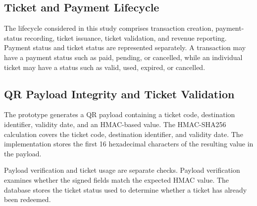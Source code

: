 \documentclass[runningheads]{llncs}
\begin{document}

\subsection{Ticket and Payment Lifecycle}

The lifecycle considered in this study comprises transaction
creation, payment-status recording, ticket issuance, ticket validation,
and revenue reporting. Payment status and ticket status are represented
separately. A transaction may have a payment status such as paid,
pending, or cancelled, while an individual ticket may have a status
such as valid, used, expired, or cancelled.

%

\subsection{QR Payload Integrity and Ticket Validation}

The prototype generates a QR payload containing a ticket code,
destination identifier, validity date, and an HMAC-based value. The
HMAC-SHA256 calculation covers the ticket code, destination identifier,
and validity date. The implementation stores the first 16 hexadecimal
characters of the resulting value in the payload.

Payload verification and ticket usage are separate checks. Payload
verification examines whether the signed fields match the expected
HMAC value. The database stores the ticket status used to determine
whether a ticket has already been redeemed.

%
\end{document}
